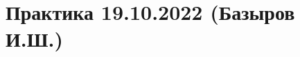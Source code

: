 \documentclass[main.tex]{subfiles}
\begin{document}

\section{Практика 19.10.2022 (Базыров И.Ш.)}
\end{document}
